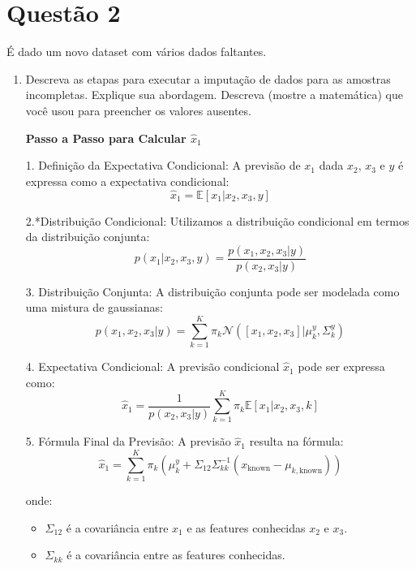 \section*{Questão 2}

É dado um novo dataset com vários dados faltantes.

\begin{enumerate}


\item Descreva as etapas para executar a imputação de dados para as amostras incompletas. Explique sua abordagem. Descreva (mostre a matemática) que você usou para preencher os valores ausentes.

\begin{tcolorbox}[colback=white, colframe=black, title=Previsão da Feature Faltante]
    \textbf{Passo a Passo para Calcular \(\hat{x}_1\)}

    1. Definição da Expectativa Condicional:
    A previsão de \(x_1\) dada \(x_2\), \(x_3\) e \(y\) é expressa como a expectativa condicional:
    \[
    \hat{x}_1 = \mathbb{E}[x_1 | x_2, x_3, y]
    \]

    2.*Distribuição Condicional:
    Utilizamos a distribuição condicional em termos da distribuição conjunta:
    \[
    p(x_1 | x_2, x_3, y) = \frac{p(x_1, x_2, x_3 | y)}{p(x_2, x_3 | y)}
    \]

    3. Distribuição Conjunta:
    A distribuição conjunta pode ser modelada como uma mistura de gaussianas:
    \[
    p(x_1, x_2, x_3 | y) = \sum_{k=1}^{K} \pi_k \mathcal{N}([x_1, x_2, x_3] | \mu_k^y, \Sigma_k^y)
    \]

    4. Expectativa Condicional:
    A previsão condicional \(\hat{x}_1\) pode ser expressa como:
    \[
    \hat{x}_1 = \frac{1}{p(x_2, x_3 | y)} \sum_{k=1}^{K} \pi_k \mathbb{E}[x_1 | x_2, x_3, k]
    \]

    5. Fórmula Final da Previsão:
    A previsão \(\hat{x}_1\) resulta na fórmula:
    \[
    \hat{x}_1 = \sum_{k=1}^{K} \pi_k \left( \mu_k^y + \Sigma_{12} \Sigma_{kk}^{-1}(x_{\text{known}} - \mu_{k,\text{known}}) \right)
    \]

    onde:
    \begin{itemize}
        \item \(\Sigma_{12}\) é a covariância entre \(x_1\) e as features conhecidas \(x_2\) e \(x_3\).
        \item \(\Sigma_{kk}\) é a covariância entre as features conhecidas.
    \end{itemize}


\end{tcolorbox}
\end{enumerate}

